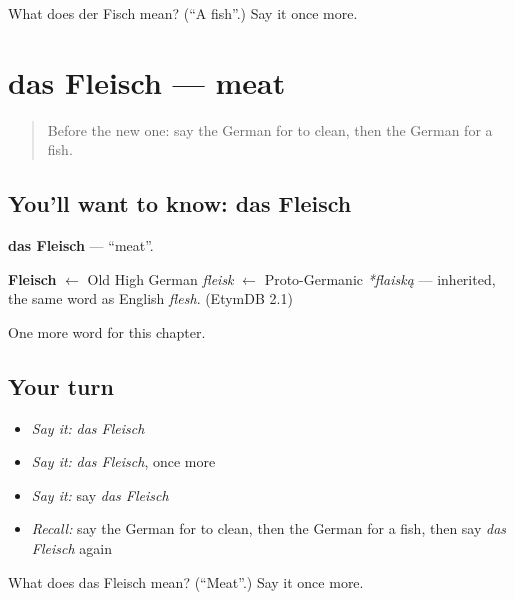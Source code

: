 \begin{tcolorbox}[breakable,colback=teal!4,colframe=teal!35!black,title={Before you move on}]
What does der Fisch mean? (\textquotedblleft{}A fish\textquotedblright{}.) Say it once more.
\end{tcolorbox}
\section[das Fleisch]{das Fleisch — meat}

\label{lesson:GE-C69-fleisch}



\begin{quote}
Before the new one: say the German for to clean, then the German for a fish.
\end{quote}

\subsection*{You'll want to know: das Fleisch}
\textbf{das Fleisch} — \textquotedblleft{}meat\textquotedblright{}.

\begin{cousinweb}
\textbf{Fleisch} $\leftarrow$ Old High German \emph{fleisk} $\leftarrow$ Proto-Germanic \emph{*flaiską} — inherited, the same word as English \emph{flesh}. (EtymDB 2.1)
\end{cousinweb}

\begin{grammarlens}[title={What you've built}]
One more word for this chapter.
\end{grammarlens}

\subsection*{Your turn}
\begin{itemize}
\raggedright
  \item \emph{Say it:} \emph{das Fleisch}
  \item \emph{Say it:} \emph{das Fleisch}, once more
  \item \emph{Say it:} say \emph{das Fleisch}
  \item \emph{Recall:} say the German for to clean, then the German for a fish, then say \emph{das Fleisch} again
\end{itemize}

\begin{tcolorbox}[breakable,colback=teal!4,colframe=teal!35!black,title={Before you move on}]
What does das Fleisch mean? (\textquotedblleft{}Meat\textquotedblright{}.) Say it once more.
\end{tcolorbox}
